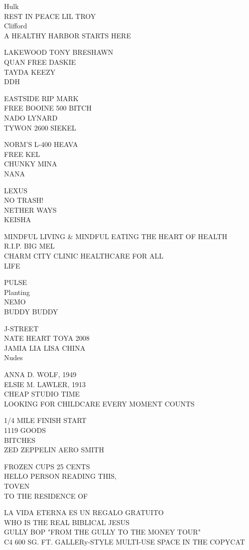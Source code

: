 \documentclass[10pt,letterpaper]{article}
\begin{document}
Hulk\\
REST IN PEACE LIL TROY\\
Clifford\\
A HEALTHY HARBOR STARTS HERE

LAKEWOOD TONY BRESHAWN\\
QUAN FREE DASKIE\\
TAYDA KEEZY\\
DDH

EASTSIDE RIP MARK\\
FREE BOOINE 500 BITCH\\
NADO LYNARD\\
TYWON 2600 SIEKEL

NORM'S L{-}400 HEAVA\\
FREE KEL\\
CHUNKY MINA\\
NANA

LEXUS\\
NO TRASH!\\
NETHER WAYS\\
KEISHA

MINDFUL LIVING \& MINDFUL EATING THE HEART OF HEALTH\\
R.I.P. BIG MEL\\
CHARM CITY CLINIC HEALTHCARE FOR ALL\\
LIFE

PULSE\\
Planting\\
NEMO\\
BUDDY BUDDY

J{-}STREET\\
NATE HEART TOYA 2008\\
JAMIA LIA LISA CHINA\\
Nudes

ANNA D. WOLF, 1949\\
ELSIE M. LAWLER, 1913\\
CHEAP STUDIO TIME\\
LOOKING FOR CHILDCARE EVERY MOMENT COUNTS

1/4 MILE FINISH START\\
1119 GOODS\\
BITCHES\\
ZED ZEPPELIN AERO SMITH

FROZEN CUPS 25 CENTS\\
HELLO PERSON READING THIS,\\
TOVEN\\
TO THE RESIDENCE OF

LA VIDA ETERNA ES UN REGALO GRATUITO\\
WHO IS THE REAL BIBLICAL JESUS\\
GULLY BOP "FROM THE GULLY TO THE MONEY TOUR"\\
C4 600 SG. FT. GALLERy{-}STYLE MULTI{-}USE SPACE IN THE COPYCAT
\end{document}
